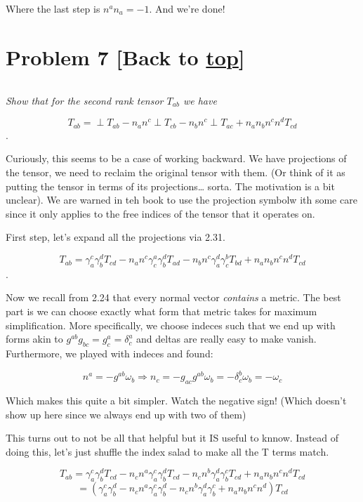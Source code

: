 \documentclass[landscape,letterpaper,10pt,english]{article}
\begin{document}
Where the last step is \(n^an_a = -1\). And we're done!

    \hypertarget{problem-7-back-to-top}{%
\section{\texorpdfstring{Problem 7 {[}Back to
\hyperref[toc]{top}{]}}{Problem 7 {[}Back to {]}}}\label{problem-7-back-to-top}}

\[\label{P7}\]

\emph{Show that for the second rank tensor \(T_{ab}\) we have}

\[ T_{ab} = \perp T_{ab} - n_an^c \perp T_{cb} - n_bn^c \perp T_{ac} + n_an_bn^cn^dT_{cd} \].

    Curiously, this seems to be a case of working backward. We have
projections of the tensor, we need to reclaim the original tensor with
them. (Or think of it as putting the tensor in terms of its
projections\ldots{} sorta. The motivation is a bit unclear). We are
warned in teh book to use the projection symbolw ith some care since it
only applies to the free indices of the tensor that it operates on.

First step, let's expand all the projections via 2.31.

\[ T_{ab} = \gamma^c_a\gamma^d_b T_{cd} - n_an^c \gamma^a_c \gamma^d_b T_{ad} - n_bn^c \gamma^d_a \gamma^b_c T_{bd} + n_an_bn^cn^dT_{cd} \].

    Now we recall from 2.24 that every normal vector \emph{contains} a
metric. The best part is we can choose exactly what form that metric
takes for maximum simplification. More specifically, we choose indeces
such that we end up with forms akin to
\(g^{ab} g_{bc} = g^a_c = \delta^a_c\) and deltas are really easy to
make vanish. Furthermore, we played with indeces and found:

\[ n^a = -g^{ab}\omega_b \Rightarrow n_c = -g_{ac}g^{ab}\omega_b = -\delta^b_c \omega_b = -\omega_c\]

Which makes this quite a bit simpler. Watch the negative sign! (Which
doesn't show up here since we always end up with two of them)

This turns out to not be all that helpful but it IS useful to knnow.
Instead of doing this, let's just shuffle the index salad to make all
the T terms match.

    \[ T_{ab} = \gamma^c_a\gamma^d_b T_{cd} - n_cn^a \gamma^c_a \gamma^d_b T_{cd} - n_cn^b \gamma^d_a \gamma^c_b T_{cd} + n_an_bn^cn^dT_{cd} \]
\[ = \left( \gamma^c_a\gamma^d_b - n_cn^a \gamma^c_a \gamma^d_b - n_cn^b \gamma^d_a \gamma^c_b + n_an_bn^cn^d \right) T_{cd} \]
\end{document}
